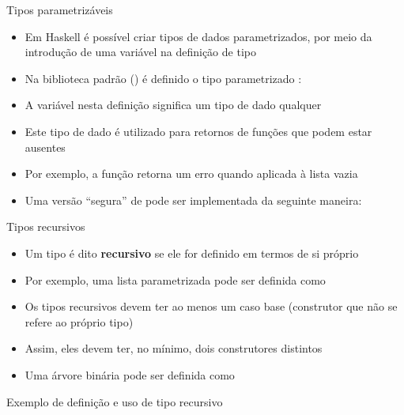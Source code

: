 \begin{frame}[fragile]{Tipos parametrizáveis}

    \begin{itemize}
        \item Em Haskell é possível criar tipos de dados parametrizados, por meio da introdução
            de uma variável na definição de tipo

        \item Na biblioteca padrão () é definido o tipo parametrizado
            :


        \item A variável  nesta definição significa um tipo de dado qualquer

        \item Este tipo de dado é utilizado para retornos de funções que podem estar ausentes

        \item Por exemplo, a função  retorna um erro quando aplicada à
            lista vazia


        \item Uma versão ``segura'' de  pode ser implementada da seguinte
            maneira:

    \end{itemize}

\end{frame}

\begin{frame}[fragile]{Tipos recursivos}

    \begin{itemize}
        \item Um tipo é dito \textbf{recursivo} se ele for definido em termos de si próprio

        \item Por exemplo, uma lista parametrizada pode ser definida como


        \item Os tipos recursivos devem ter ao menos um caso base (construtor que não se refere
            ao próprio tipo)

        \item Assim, eles devem ter, no mínimo, dois construtores distintos

        \item Uma árvore binária pode ser definida como

    \end{itemize}

\end{frame}

\begin{frame}[fragile]{Exemplo de definição e uso de tipo recursivo}
\end{frame}

